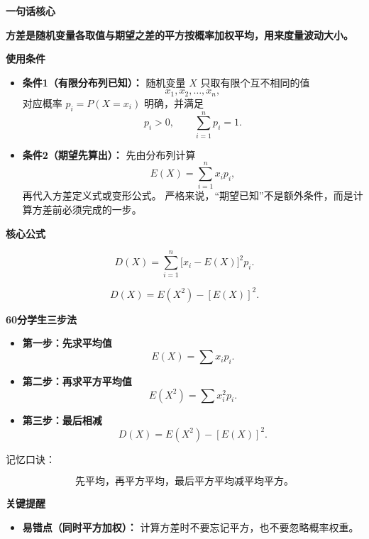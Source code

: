 \begin{summarybox}
	\textbf{\textcolor{CSummary}{一句话核心}}

	\textbf{方差是随机变量各取值与期望之差的平方按概率加权平均，用来度量波动大小。}

	\medskip

	\textbf{\textcolor{CSummary}{使用条件}}

	\begin{itemize}[leftmargin=*, itemsep=0.5em, topsep=0.4em]
		\item \textbf{条件1（有限分布列已知）：}
		      随机变量 $X$ 只取有限个互不相同的值
		      \[
			      x_1,x_2,\dots,x_n,
		      \]
		      对应概率 $p_i=P(X=x_i)$ 明确，并满足
		      \[
			      p_i>0,\qquad \sum_{i=1}^{n}p_i=1.
		      \]

		\item \textbf{条件2（期望先算出）：}
		      先由分布列计算
		      \[
			      E(X)=\sum_{i=1}^{n}x_ip_i,
		      \]
		      再代入方差定义式或变形公式。
		      严格来说，“期望已知”不是额外条件，而是计算方差前必须完成的一步。
	\end{itemize}

	\medskip

	\textbf{\textcolor{CSummary}{核心公式}}

	\[
		D(X)=\sum_{i=1}^{n}\bigl[x_i-E(X)\bigr]^2p_i.
	\]

	\[
		D(X)=E(X^2)-[E(X)]^2.
	\]

	\medskip

	\textbf{\textcolor{CSummary}{60分学生三步法}}

	\begin{itemize}[leftmargin=*, itemsep=0.5em, topsep=0.4em]
		\item \textbf{第一步：先求平均值}
		      \[
			      E(X)=\sum x_ip_i.
		      \]

		\item \textbf{第二步：再求平方平均值}
		      \[
			      E(X^2)=\sum x_i^2p_i.
		      \]

		\item \textbf{第三步：最后相减}
		      \[
			      D(X)=E(X^2)-[E(X)]^2.
		      \]
	\end{itemize}

	记忆口诀：

	\[
		\boxed{\text{先平均，再平方平均，最后平方平均减平均平方。}}
	\]

	\medskip

	\textbf{\textcolor{CSummary}{关键提醒}}

	\begin{itemize}[leftmargin=*, itemsep=0.5em, topsep=0.4em]
		\item \textbf{易错点（同时平方加权）：}
		      计算方差时不要忘记平方，也不要忽略概率权重。


\end{itemize}
\end{summarybox}
